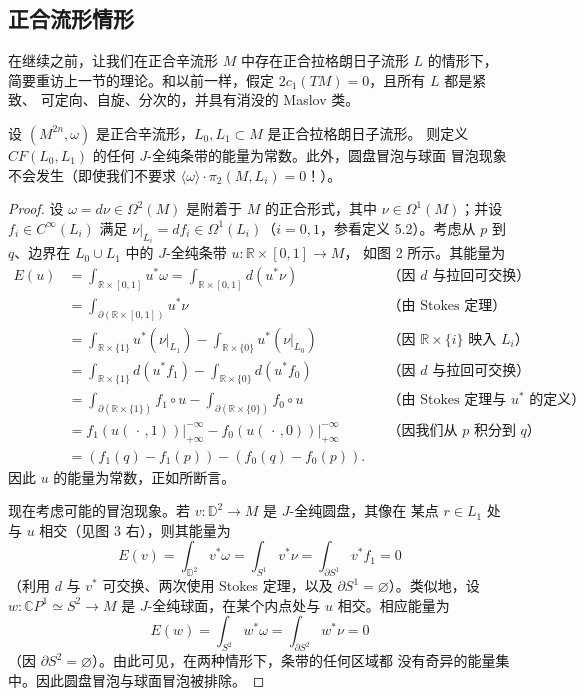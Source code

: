 \subsection{正合流形情形}\label{sec:5.8}

在继续之前，让我们在正合辛流形 $M$ 中存在正合拉格朗日子流形 $L$ 的情形下，
简要重访上一节的理论。和以前一样，假定 $2c_1(TM)=0$，且所有 $L$ 都是紧致、
可定向、自旋、分次的，并具有消没的 Maslov 类。

\begin{Lem}\label{lem:5.44}
设 $(M^{2n},\omega)$ 是正合辛流形，$L_0,L_1\subset M$ 是正合拉格朗日子流形。
则定义 $CF(L_0,L_1)$ 的任何 $J$-全纯条带的能量为常数。此外，圆盘冒泡与球面
冒泡现象不会发生（即使我们不要求 $\langle\omega\rangle\cdot\pi_2(M,L_i)=0$！）。
\end{Lem}

\begin{proof}
设 $\omega=d\nu\in\Omega^2(M)$ 是附着于 $M$ 的正合形式，其中
$\nu\in\Omega^1(M)$；并设 $f_i\in C^\infty(L_i)$ 满足
$\nu|_{L_i}=df_i\in\Omega^1(L_i)$（$i=0,1$，参看定义 5.2）。考虑从 $p$ 到
$q$、边界在 $L_0\cup L_1$ 中的 $J$-全纯条带 $u:\mathbb R\times[0,1]\to M$，
如图 2 所示。其能量为
\begin{equation}
\begin{aligned}
E(u)&=\int_{\mathbb R\times[0,1]}u^*\omega
=\int_{\mathbb R\times[0,1]}d(u^*\nu)
&&\text{（因 $d$ 与拉回可交换）}\\
&=\int_{\partial(\mathbb R\times[0,1])}u^*\nu
&&\text{（由 Stokes 定理）}\\
&=\int_{\mathbb R\times\{1\}}u^*(\nu|_{L_1})
-\int_{\mathbb R\times\{0\}}u^*(\nu|_{L_0})
&&\text{（因 $\mathbb R\times\{i\}$ 映入 $L_i$）}\\
&=\int_{\mathbb R\times\{1\}}d(u^*f_1)
-\int_{\mathbb R\times\{0\}}d(u^*f_0)
&&\text{（因 $d$ 与拉回可交换）}\\
&=\int_{\partial(\mathbb R\times\{1\})}f_1\circ u
-\int_{\partial(\mathbb R\times\{0\})}f_0\circ u
&&\text{（由 Stokes 定理与 $u^*$ 的定义）}\\
&=\left.f_1(u(\,\cdot\,,1))\right|_{+\infty}^{-\infty}
-\left.f_0(u(\,\cdot\,,0))\right|_{+\infty}^{-\infty}
&&\text{（因我们从 $p$ 积分到 $q$）}\\
&=(f_1(q)-f_1(p))-(f_0(q)-f_0(p)).
\end{aligned}
\label{eq:5.77}
\end{equation}
因此 $u$ 的能量为常数，正如所断言。

现在考虑可能的冒泡现象。若 $v:\mathbb D^2\to M$ 是 $J$-全纯圆盘，其像在
某点 $r\in L_1$ 处与 $u$ 相交（见图 3 右），则其能量为
\[
E(v)=\int_{\mathbb D^2}v^*\omega=\int_{S^1}v^*\nu
=\int_{\partial S^1}v^*f_1=0
\]
（利用 $d$ 与 $v^*$ 可交换、两次使用 Stokes 定理，以及
$\partial S^1=\varnothing$）。类似地，设 $w:\mathbb C P^1\simeq S^2\to M$ 是
$J$-全纯球面，在某个内点处与 $u$ 相交。相应能量为
\[
E(w)=\int_{S^2}w^*\omega=\int_{\partial S^2}w^*\nu=0
\]
（因 $\partial S^2=\varnothing$）。由此可见，在两种情形下，条带的任何区域都
没有奇异的能量集中。因此圆盘冒泡与球面冒泡被排除。
\end{proof}

